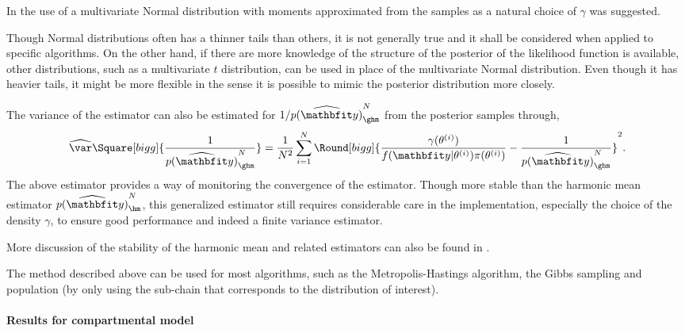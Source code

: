 In \cite{Gelfand:1994ux} the use of a multivariate Normal distribution with moments approximated from the samples as a natural choice of $\gamma$ was suggested.
\begin{draftpar}
Though Normal distributions often has a thinner tails than others, it is not generally true and it shall be considered when applied to specific algorithms. On the other hand, if there are more knowledge of the structure of the posterior of the likelihood function is available, other distributions, such as a multivariate $t$ distribution, can be used in place of the multivariate Normal distribution. Even though it has heavier tails, it might be more flexible in the sense it is possible to mimic the posterior distribution more closely.
\end{draftpar}

The variance of the estimator can also be estimated for $1/\widehat{p(\data)}_{\ghm}^N$ from the posterior samples through,
\begin{equation}
  \widehat{\var}\Square[bigg]{\frac{1}{\widehat{p(\data)}_{\ghm}^N}} =
  \frac{1}{N^2}\sum_{i=1}^N \Round[bigg]{
    \frac{\gamma(\theta^{(i)})}{f(\data|\theta^{(i)})\pi(\theta^{(i)})}
    - \frac{1}{\widehat{p(\data)}_{\ghm}^N}}^2.
\end{equation}
The above estimator provides a way of monitoring the convergence of the estimator. Though more stable than the harmonic mean estimator $\widehat{p(\data)}_{\hm}^N$, this generalized estimator still requires considerable care in the implementation, especially the choice of the density $\gamma$, to ensure good performance and indeed a finite variance estimator.
\begin{draftpar}
More discussion of the stability of the harmonic mean and related estimators can also be found in \cite{Raftery:2007ud}.
\end{draftpar}

The method described above can be used for most \mcmc algorithms, such as the Metropolis-Hastings algorithm, the Gibbs sampling and population \mcmc (by only using the sub-chain that corresponds to the distribution of interest).

\paragraph{Results for \pet compartmental model}

